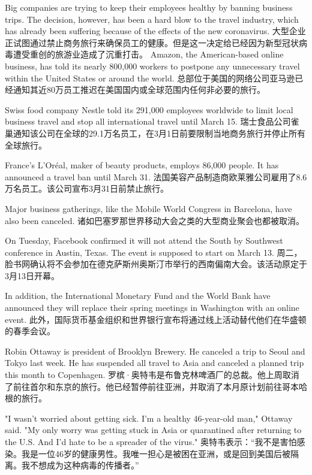 Big companies are trying to keep their employees healthy by banning business trips. The decision, however, has been a hard blow to the travel industry, which has already been suffering because of the effects of the new coronavirus.
大型企业正试图通过禁止商务旅行来确保员工的健康。但是这一决定给已经因为新型冠状病毒遭受重创的旅游业造成了沉重打击。
Amazon, the American-based online business, has told its nearly 800,000 workers to postpone any unnecessary travel within the United States or around the world.
总部位于美国的网络公司亚马逊已经通知其近80万员工推迟在美国国内或全球范围内任何非必要的旅行。

Swiss food company Nestle told its 291,000 employees worldwide to limit local business travel and stop all international travel until March 15.
瑞士食品公司雀巢通知该公司在全球的29.1万名员工，在3月1日前要限制当地商务旅行并停止所有全球旅行。

France's L'Oréal, maker of beauty products, employs 86,000 people. It has announced a travel ban until March 31.
法国美容产品制造商欧莱雅公司雇用了8.6万名员工。该公司宣布3月31日前禁止旅行。

Major business gatherings, like the Mobile World Congress in Barcelona, have also been canceled.
诸如巴塞罗那世界移动大会之类的大型商业聚会也都被取消。

On Tuesday, Facebook confirmed it will not attend the South by Southwest conference in Austin, Texas. The event is supposed to start on March 13.
周二，脸书网确认将不会参加在德克萨斯州奥斯汀市举行的西南偏南大会。该活动原定于3月13日开幕。

In addition, the International Monetary Fund and the World Bank have announced they will replace their spring meetings in Washington with an online event.
此外，国际货币基金组织和世界银行宣布将通过线上活动替代他们在华盛顿的春季会议。

Robin Ottaway is president of Brooklyn Brewery. He canceled a trip to Seoul and Tokyo last week. He has suspended all travel to Asia and canceled a planned trip this month to Copenhagen.
罗槟·奥特韦是布鲁克林啤酒厂的总裁。他上周取消了前往首尔和东京的旅行。他已经暂停前往亚洲，并取消了本月原计划前往哥本哈根的旅行。

"I wasn't worried about getting sick. I'm a healthy 46-year-old man," Ottaway said. "My only worry was getting stuck in Asia or quarantined after returning to the U.S. And I'd hate to be a spreader of the virus."
奥特韦表示：“我不是害怕感染。我是一位46岁的健康男性。我唯一担心是被困在亚洲，或是回到美国后被隔离。我不想成为这种病毒的传播者。”

